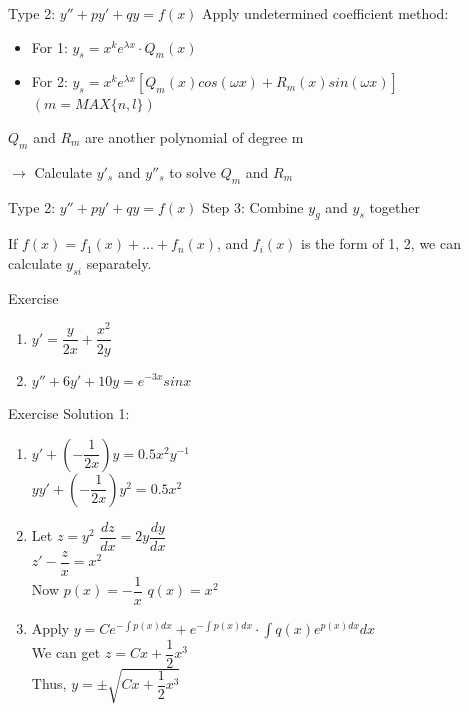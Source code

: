\documentclass{beamer}
\begin{document}
\begin{frame}{Type 2: $y'' + py' + qy = f(x)$}
Apply undetermined coefficient method:
\begin{itemize}
    \item For 1: $y_s = x^k e^{\lambda x}\cdot Q_m(x) $
    \item For 2: $y_s = x^k e^{\lambda x}[Q_m(x)cos(\omega x) + R_m(x) sin(\omega x)]$\  
    $(m = MAX\{n ,l\})$
\end{itemize}
$Q_m$ and $R_m$ are another polynomial of degree m

$\rightarrow$ Calculate $y'_s$ and $y''_s$ to solve $Q_m$ and $R_m$
    
\end{frame}

\begin{frame}{Type 2: $y'' + py' + qy = f(x)$}
    Step 3: Combine $y_g$ and $y_s$ together
    
    If $f(x) = f_1(x) + ... + f_n(x)$, and $f_i(x)$ is the form of 1, 2, we can calculate $y_{si}$ separately.
\end{frame}

\begin{frame}{Exercise}
    \begin{enumerate}
        \item $y' = \dfrac{y}{2x} + \dfrac{x^2}{2y}$
        \item $y'' + 6y' + 10y = e^{-3x}sinx$
    \end{enumerate}
\end{frame}

\begin{frame}{Exercise}
    Solution 1:
    
    \begin{enumerate}
        \item $y' + (-\dfrac{1}{2x})y = 0.5x^2y^{-1}$\\
        $yy' + (-\dfrac{1}{2x})y^2 = 0.5 x^2$
        \item Let $z = y^2$ \rightarrow $\dfrac{dz}{dx} = 2y \dfrac{dy}{dx}$\\ $z' - \dfrac{z}{x} = x^2$\\Now $p(x) = -\dfrac{1}{x}$ $q(x) = x^2$
        \item Apply $y = Ce^{-\int p(x)dx} + e^{-\int p(x)dx}\cdot \int q(x)e^{p(x)dx} dx$ \\We can get $z = Cx + \dfrac{1}{2}x^3$\\Thus, $y = \pm \sqrt{Cx + \dfrac{1}{2}x^3}$
        
    \end{enumerate}
\end{frame}
\end{document}
